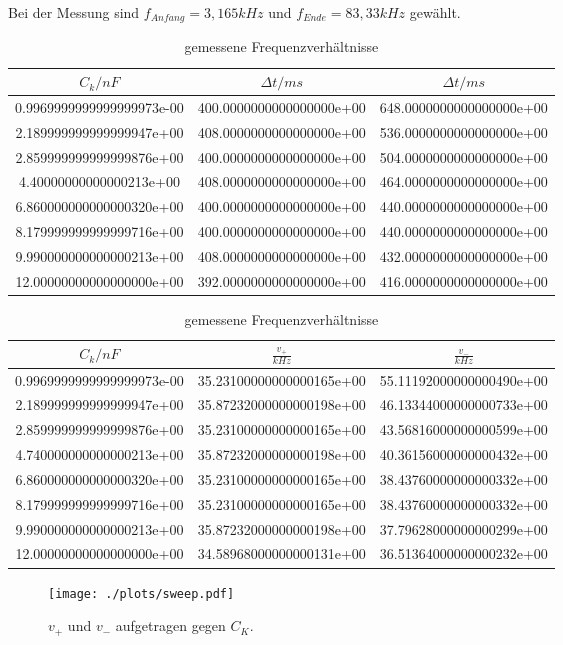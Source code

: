 Bei der Messung sind $f_{Anfang} = 3,165kHz$ und $f_{Ende} = 83,33kHz$ gewählt.

\begin{table}
  \centering
\caption{gemessene Frequenzverhältnisse}
\label{tab:sweep}
\begin{tabular}{S S S}
  \toprule
  {$C_k/nF$} & {$\Delta t/ms$} & {$\Delta t/ms$}\\
  \midrule
  0.9969999999999999973e-00 & 400.0000000000000000e+00 & 648.0000000000000000e+00\\
  2.189999999999999947e+00 & 408.0000000000000000e+00 & 536.0000000000000000e+00\\
  2.859999999999999876e+00 & 400.0000000000000000e+00 & 504.0000000000000000e+00\\
  4.40000000000000213e+00 & 408.0000000000000000e+00 & 464.0000000000000000e+00\\
  6.860000000000000320e+00 & 400.0000000000000000e+00 & 440.0000000000000000e+00\\
  8.179999999999999716e+00 & 400.0000000000000000e+00 & 440.0000000000000000e+00\\
  9.990000000000000213e+00 & 408.0000000000000000e+00 & 432.0000000000000000e+00\\
  12.00000000000000000e+00 & 392.0000000000000000e+00 & 416.0000000000000000e+00\\
\bottomrule
\end{tabular}
\end{table}
\FloatBarrier

\begin{table}
  \centering
\caption{gemessene Frequenzverhältnisse}
\label{tab:sweep}
\begin{tabular}{S S S}
  \toprule
  {$C_k/nF$} & {$\frac{v_+}{kHz}$} & {$\frac{v_-}{kHz}$}\\
  \midrule
  0.9969999999999999973e-00 & 35.23100000000000165e+00 & 55.11192000000000490e+00\\
  2.189999999999999947e+00 & 35.87232000000000198e+00 & 46.13344000000000733e+00\\
  2.859999999999999876e+00 & 35.23100000000000165e+00 & 43.56816000000000599e+00\\
  4.740000000000000213e+00 & 35.87232000000000198e+00 & 40.36156000000000432e+00\\
  6.860000000000000320e+00 & 35.23100000000000165e+00 & 38.43760000000000332e+00\\
  8.179999999999999716e+00 & 35.23100000000000165e+00 & 38.43760000000000332e+00\\
  9.990000000000000213e+00 & 35.87232000000000198e+00 & 37.79628000000000299e+00\\
  12.00000000000000000e+00 & 34.58968000000000131e+00 & 36.51364000000000232e+00\\

\bottomrule
\end{tabular}
\end{table}
\FloatBarrier


\begin{figure}
  \centering
  \texttt{[image: ./plots/sweep.pdf]}
  \caption{$v_+$ und $v_-$ aufgetragen gegen $C_K$.}
  \label{fig:sweep}
\end{figure}
\FloatBarrier
